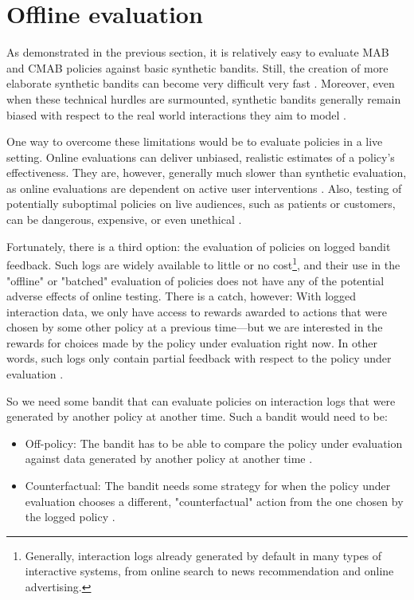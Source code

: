 \documentclass{jss}
\begin{document}
\section{Offline evaluation} \label{offl}

As demonstrated in the previous section, it is relatively easy to evaluate MAB and CMAB policies against basic synthetic bandits. Still, the creation of more elaborate synthetic bandits can become very difficult very fast \citep{Strehl2006a}. Moreover, even when these technical hurdles are surmounted, synthetic bandits generally remain biased with respect to the real world interactions they aim to model \citep{Li2012,Li2011}.

One way to overcome these limitations would be to evaluate policies in a live setting. Online evaluations can deliver unbiased, realistic estimates of a policy's effectiveness. They are, however, generally much slower than synthetic evaluation, as online evaluations are dependent on active user interventions \citep{Mandel2016, Tewari2017}. Also, testing of potentially suboptimal policies on live audiences, such as patients or customers, can be dangerous, expensive, or even unethical \citep{Bastani2015}.

Fortunately, there is a third option: the evaluation of policies on logged bandit feedback. Such logs are widely available to little or no cost\footnote{Generally, interaction logs already generated by default in many types of interactive systems, from online search to news recommendation and online advertising.}, and their use in the "offline" or "batched" evaluation of policies does not have any of the potential adverse effects of online testing. There is a catch, however: With logged interaction data, we only have access to rewards awarded to actions that were chosen by some other policy at a previous time---but we are interested in the rewards for choices made by the policy under evaluation right now. In other words, such logs only contain partial feedback with respect to the policy under evaluation \citep{Strehl2010}.

So we need some bandit that can evaluate policies on interaction logs that were generated by another policy at another time. Such a bandit would need to be:

\begin{itemize}
   \item{Off-policy: The bandit has to be able to compare the policy under evaluation against data generated by another policy at another time \citep{Li2012,Li2011}.
   }
   \item{Counterfactual: The bandit needs some strategy for when the policy under evaluation chooses a different, "counterfactual" action from the one chosen by the logged policy \citep{Bottou2013,Swaminathan2015}.}
\end{itemize}
\end{document}
